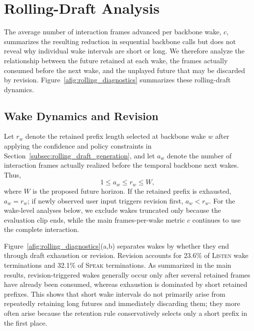 \section{Rolling-Draft Analysis}
\label{asec:rolling_draft}

The average number of interaction frames advanced per backbone wake, $c$, summarizes the resulting reduction in sequential backbone calls but does not reveal why individual wake intervals are short or long.
We therefore analyze the relationship between the future retained at each wake, the frames actually consumed before the next wake, and the unplayed future that may be discarded by revision.
Figure~\ref{afig:rolling_diagnostics} summarizes these rolling-draft dynamics.


\subsection{Wake Dynamics and Revision}
\label{asubsec:wake_dynamics}

Let $r_w$ denote the retained prefix length selected at backbone wake $w$ after applying the confidence and policy constraints in Section~\ref{subsec:rolling_draft_generation}, and let $a_w$ denote the number of interaction frames actually realized before the temporal backbone next wakes.
Thus,
\[
1 \leq a_w \leq r_w \leq W,
\]
where $W$ is the proposed future horizon.
If the retained prefix is exhausted, $a_w=r_w$; if newly observed user input triggers revision first, $a_w<r_w$.
For the wake-level analyses below, we exclude wakes truncated only because the evaluation clip ends, while the main frames-per-wake metric $c$ continues to use the complete interaction.

Figure~\ref{afig:rolling_diagnostics}(a,b) separates wakes by whether they end through draft exhaustion or revision.
Revision accounts for 23.6\% of \textsc{Listen} wake terminations and 32.1\% of \textsc{Speak} terminations.
As summarized in the main results, revision-triggered wakes generally occur only after several retained frames have already been consumed, whereas exhaustion is dominated by short retained prefixes.
This shows that short wake intervals do not primarily arise from repeatedly retaining long futures and immediately discarding them; they more often arise because the retention rule conservatively selects only a short prefix in the first place.

